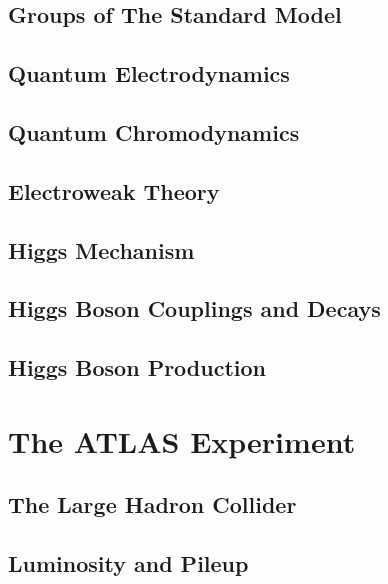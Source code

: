 \documentclass{umassthesis}          %
\begin{document}
\section{Groups of The Standard Model}\label{sec:theory_groups}

\section{Quantum Electrodynamics}\label{sec:theory_qed}

\section{Quantum Chromodynamics}\label{sec:theory_qcd}

\section{Electroweak Theory}\label{sec:theory_ew}

\section{Higgs Mechanism}\label{sec:theory_higgs_mechanism}

\section{Higgs Boson Couplings and Decays}\label{sec:theory_higgs_decay}

\section{Higgs Boson Production}\label{sec:theory_higgs_production}


\chapter{The ATLAS Experiment}\label{ch:atlas}
\section{The Large Hadron Collider}\label{sec:lhc}


\section{Luminosity and Pileup}\label{sec:luminosity_pileup}


% 
\end{document}
